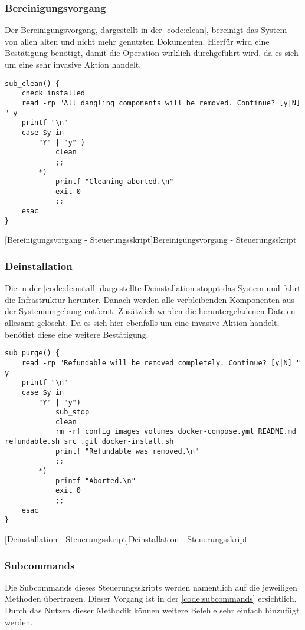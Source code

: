 \subsubsection{Bereinigungsvorgang}

Der Bereinigungsvorgang, dargestellt in der \autoref{code:clean}, bereinigt das System von allen alten und nicht mehr genutzten Dokumenten. Hierfür wird eine Bestätigung benötigt, damit die Operation wirklich durchgeführt wird, da es sich um eine sehr invasive Aktion handelt.

\begin{verbatim}
sub_clean() {
	check_installed
	read -rp "All dangling components will be removed. Continue? [y|N] " y
	printf "\n"
	case $y in
		"Y" | "y" )
			clean
			;;
		*)
			printf "Cleaning aborted.\n"
			exit 0
			;;
	esac
}
\end{verbatim}
[Bereinigungsvorgang - Steuerungsskript]{Bereinigungsvorgang - Steuerungsskript}
\label{code:clean}

\newpage

\subsubsection{Deinstallation}
Die in der \autoref{code:deinstall} dargestellte Deinstallation stoppt das System und fährt die Infrastruktur herunter. Danach werden alle verbleibenden Komponenten aus der Systemumgebung entfernt. Zusätzlich werden die heruntergeladenen Dateien allesamt gelöscht. Da es sich hier ebenfalls um eine invasive Aktion handelt, benötigt diese eine weitere Bestätigung.

\begin{verbatim}
sub_purge() {
	read -rp "Refundable will be removed completely. Continue? [y|N] " y
	printf "\n"
	case $y in
		"Y" | "y")
			sub_stop
			clean
			rm -rf config images volumes docker-compose.yml README.md refundable.sh src .git docker-install.sh
			printf "Refundable was removed.\n"
			;;
		*)
			printf "Aborted.\n"
			exit 0
			;;
	esac
}
\end{verbatim}
[Deinstallation - Steuerungsskript]{Deinstallation - Steuerungsskript}
\label{code:deinstall}

\subsubsection{Subcommands}

Die Subcommands dieses Steuerungsskripts werden namentlich auf die jeweiligen Methoden übertragen. \cite{shgist} Dieser Vorgang ist in der \autoref{code:subcommands} ersichtlich. Durch das Nutzen dieser Methodik können weitere Befehle sehr einfach hinzufügt werden.

